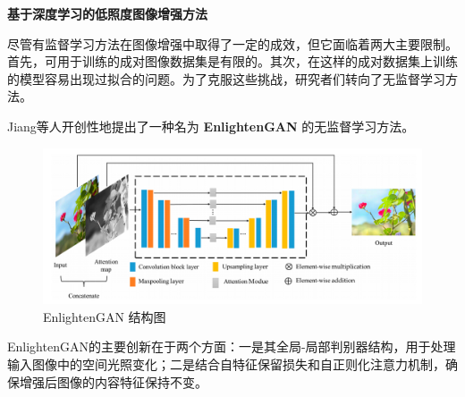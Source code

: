 \documentclass[CJK,aspectratio=169]{beamer}  %
\begin{document}
	\begin{frame}
	{ \yahei \textbf{基于深度学习的低照度图像增强方法}}
	
	{ \yahei 尽管有监督学习方法在图像增强中取得了一定的成效，但它面临着两大主要限制。首先，可用于训练的成对图像数据集是有限的。其次，在这样的成对数据集上训练的模型容易出现过拟合的问题。为了克服这些挑战，研究者们转向了无监督学习方法。}
	
	{ \yahei Jiang等人\textcolor{blue}{\citep{jiang2021enlightengan}}开创性地提出了一种名为 \textbf{EnlightenGAN} 的无监督学习方法。}
	
	\begin{figure}
		\centering
		\setlength{\abovecaptionskip}{-0.05cm}
		\begin{minipage}{.6\columnwidth}
			\includegraphics[width=\columnwidth]{picture/LLIE/EnlightenGAN/EnlightenGAN}
			\caption{
				\label{fig: EnlightenGAN Architecture} 
				\tiny EnlightenGAN 结构图
			}
		\end{minipage}
	\end{figure}
	
	{ \yahei EnlightenGAN的主要创新在于两个方面：一是其全局-局部判别器结构，用于处理输入图像中的空间光照变化；二是结合自特征保留损失和自正则化注意力机制，确保增强后图像的内容特征保持不变。}
	
	\end{frame}
	
\end{document}
